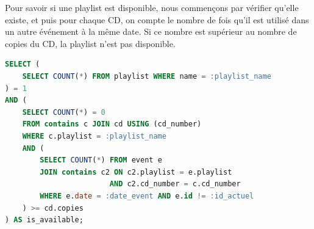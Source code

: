 Pour savoir si une playlist est disponible, nous commençons par vérifier qu'elle existe, et puis pour chaque CD,
on compte le nombre de fois qu'il est utilisé dans un autre événement à la même date. Si ce nombre est supérieur au nombre de copies du CD,
la playlist n'est pas disponible.
\begin{lstlisting}[language=SQL, title={Requête de vérification de disponibilité de playlist}]
SELECT (
    SELECT COUNT(*) FROM playlist WHERE name = :playlist_name
) = 1
AND (
    SELECT COUNT(*) = 0
    FROM contains c JOIN cd USING (cd_number)
    WHERE c.playlist = :playlist_name
    AND (
        SELECT COUNT(*) FROM event e
        JOIN contains c2 ON c2.playlist = e.playlist
                        AND c2.cd_number = c.cd_number
        WHERE e.date = :date_event AND e.id != :id_actuel
    ) >= cd.copies
) AS is_available;
\end{lstlisting}


